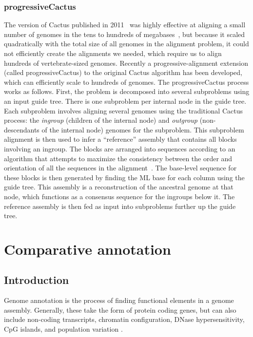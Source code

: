 \documentclass[fleqn,10pt]{wlscirep}
\begin{document}
\subsubsection{progressiveCactus}
The version of Cactus published in 2011~\cite{cactusGenomeRes} was highly effective at aligning a small number of genomes in the tens to hundreds of megabases~\cite{Earl2014}, but because it scaled quadratically with the total size of all genomes in the alignment problem, it could not efficiently create the alignments we needed, which require us to align hundreds of vertebrate-sized genomes.
Recently a progressive-alignment extension (called progressiveCactus) to the original Cactus algorithm has been developed, which can efficiently scale to hundreds of genomes.
The progressiveCactus process works as follows.
First, the problem is decomposed into several subproblems using an input guide tree.
There is one subproblem per internal node in the guide tree.
Each subproblem involves aligning several genomes using the traditional Cactus process: the \emph{ingroup} (children of the internal node) and \emph{outgroup} (non-descendants of the internal node) genomes for the subproblem.
This subproblem alignment is then used to infer a ``reference'' assembly that contains all blocks involving an ingroup.
The blocks are arranged into sequences according to an algorithm that attempts to maximize the consistency between the order and orientation of all the sequences in the alignment~\cite{referenceAlg}.
The base-level sequence for these blocks is then generated by finding the ML base for each column using the guide tree.
This assembly is a reconstruction of the ancestral genome at that node, which functions as a consensus sequence for the ingroups below it.
The reference assembly is then fed as input into subproblems further up the guide tree.
\section{Comparative annotation}
\subsection{Introduction}
Genome annotation is the process of finding functional elements in a genome assembly. Generally, these take the form of protein coding genes, but can also include non-coding transcripts\cite{harrow2012gencode}, chromatin configuration, DNase hypersensitivity\cite{encode2004encode}, CpG islands, and population variation \cite{sherry2001dbsnp}.
\end{document}
